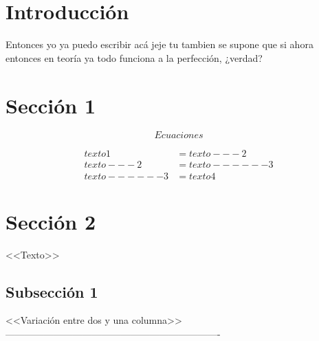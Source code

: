 \documentclass[letterpaper,11pt]{article}
\begin{document}




\begin{multicols}{2}

\section{Introducción}


    Entonces yo ya puedo escribir acá jeje tu tambien se supone que si ahora entonces en teoría ya todo funciona a la perfección, ¿verdad?




\section{Sección 1} 

\begin{equation}
    Ecuaciones
\label{ecuacion}
\end{equation}

\begin{equation*} %
\begin{split}
    texto1 & = texto---2 \\
    texto---2 & = texto------3 \\
    texto------3 & = texto4
\end{split}
\end{equation*}

\section{Sección 2}

<<Texto>>

\end{multicols}

\subsection{Subsección 1}

<<Variación entre dos y una columna>> -------------------------------------------------------------------
\end{document}
